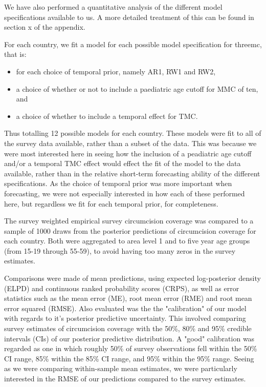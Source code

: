 \documentclass[a4paper, 12pt]{article}
\begin{document}
We have also performed a quantitative analysis of the different model specifications available
to us. A more detailed treatment of this can be found in section x of the appendix. 

For each country, we fit a model for each possible model specification for threemc, that is:
\begin{itemize}
\item for each choice of temporal prior, namely AR1, RW1 and RW2,
\item a choice of whether or not to include a paediatric age cutoff for MMC of ten, and
\item a choice of whether to include a temporal effect for TMC.
\end{itemize}
Thus totalling 12 possible models for each country.
These models were fit to all of the survey data available, rather than a subset of the data.
This was because we were most interested here in seeing how the inclusion of a peadiatric age cutoff and/or a temporal TMC effect would effect the fit of the model to the data available, rather than in the relative short-term forecasting ability of the different specifications.
As the choice of temporal prior was more important when forecasting, we were not especially interested in how each of these performed here, but regardless we fit for each temporal prior, for completeness. 

The survey weighted empirical survey circumcision coverage was compared to a sample of 1000 draws from the posterior predictions of circumcision coverage for each country.
Both were aggregated to area level 1 and to five year age groups (from 15-19 through 55-59), to avoid having too many zeros in the survey estimates.

Comparisons were made of mean predictions, using expected log-posterior density (ELPD) and continuous ranked probability scores (CRPS), as well as error statistics such as the mean error (ME), root mean error (RME) and root mean error squared (RMSE).
Also evaluated was the the "calibration" of our model with regards to it's posterior predictive uncertainty.
This involved comparing survey estimates of circumcision coverage with the 50\%, 80\% and 95\% credible intervals (CIs) of our posterior predictive distribution. A "good" calibration was regarded as one in which roughly 50\% of survey observations fell within the 50\% CI range, 85\% within the 85\% CI range, and 95\% within the 95\% range.
Seeing as we were comparing within-sample mean estimates, we were particularly interested in the RMSE of our predictions compared to the survey estimates. 
\end{document}
